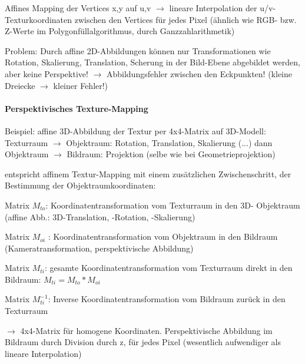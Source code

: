 \documentclass[landscape]{article}
\begin{document}
\begin{multicols}{3}
  Affines Mapping der Vertices x,y auf u,v $\rightarrow$ lineare Interpolation der u/v-Texturkoordinaten zwischen den Vertices für jedes Pixel (ähnlich wie RGB- bzw. Z-Werte im Polygonfüllalgorithmus, durch Ganzzahlarithmetik)
  
  
  Problem: Durch affine 2D-Abbildungen können nur Transformationen wie Rotation, Skalierung, Translation, Scherung in der Bild-Ebene abgebildet werden, aber keine Perspektive! $\rightarrow$ Abbildungsfehler zwischen den Eckpunkten! (kleine Dreiecke $\rightarrow$ kleiner Fehler!)
  
  \paragraph{Perspektivisches Texture-Mapping}
  Beispiel: affine 3D-Abbildung der Textur per 4x4-Matrix auf 3D-Modell: 
  Texturraum $\rightarrow$ Objektraum: Rotation, Translation, Skalierung (...) dann Objektraum $\rightarrow$ Bildraum: Projektion (selbe wie bei Geometrieprojektion)
  
  
  entspricht affinem Textur-Mapping mit einem zusätzlichen Zwischenschritt, der Bestimmung der Objektraumkoordinaten:
  \begin{itemize*}
    \item Matrix $M_{to}$: Koordinatentransformation vom Texturraum in den 3D- Objektraum (affine Abb.: 3D-Translation, -Rotation, -Skalierung)
    \item Matrix $M_{oi}$ : Koordinatentransformation vom Objektraum in den Bildraum (Kameratransformation, perspektivische Abbildung)
    \item Matrix $M_{ti}$: gesamte Koordinatentransformation vom Texturraum direkt in den Bildraum: $M_{ti} = M_{to}*M_{oi}$
    \item Matrix $M_{ti}^{-1}$: Inverse Koordinatentransformation vom Bildraum zurück in den Texturraum
  \end{itemize*}
  
  $\rightarrow$ 4x4-Matrix für homogene Koordinaten. Perspektivische Abbildung im Bildraum durch Division durch z, für jedes Pixel (wesentlich aufwendiger als lineare Interpolation)
  

\end{multicols}
\end{document}
